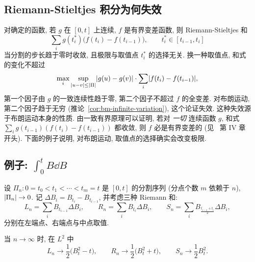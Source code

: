 \subsection{Riemann-Stieltjes 积分为何失效}

对确定的函数, 若 $g$ 在 $[0,t]$ 上连续, $f$ 是有界变差函数, 则 Riemann-Stieltjes 和
\[
\sum_ig(t_i^*)\big(f(t_i)-f(t_{i-1})\big),\qquad t_i^*\in[t_{i-1},t_i]
\]
当分割的步长趋于零时收敛, 且极限与取值点 $t_i^*$ 的选择无关. 换一种取值点, 和式的变化不超过
\[
\max_i\sup_{\lvert u-v\rvert\le\lvert\Pi\rvert}\lvert g(u)-g(v)\rvert\cdot\sum_i\lvert f(t_i)-f(t_{i-1})\rvert,
\]
第一个因子由 $g$ 的一致连续性趋于零, 第二个因子不超过 $f$ 的全变差. 对布朗运动, 第二个因子趋于无穷 (推论~\ref{cor:bm-infinite-variation}), 这个论证失效. 这种失效源于布朗运动本身的性质. 由一致有界原理可以证明, 若对 \emph{一切} 连续函数 $g$, 和式 $\sum_ig(t_{i-1})(f(t_i)-f(t_{i-1}))$ 都收敛, 则 $f$ 必是有界变差的 (见~\cite{revuz} 第 IV 章开头). 下面的例子说明, 对布朗运动, 取值点的选择确实会改变极限.

\subsection{\texorpdfstring{例子: $\int_0^tB\dd B$}{例子: ∫B dB}}

设 $\Pi_n: 0=t_0<t_1<\cdots<t_m=t$ 是 $[0,t]$ 的分割序列 (分点个数 $m$ 依赖于 $n$), $\lvert\Pi_n\rvert\to0$. 记 $\Delta B_i=B_{t_i}-B_{t_{i-1}}$, 并考虑三种 Riemann 和:
\[
L_n=\sum_iB_{t_{i-1}}\Delta B_i,\qquad R_n=\sum_iB_{t_i}\Delta B_i,\qquad S_n=\sum_iB_{\frac{t_{i-1}+t_i}{2}}\Delta B_i,
\]
分别在左端点、右端点与中点取值.

\begin{proposition}\label{prop:three-sums}
当 $n\to\infty$ 时, 在 $L^2$ 中
\[
L_n\to\frac{1}{2}\big(B_t^2-t\big),\qquad R_n\to\frac{1}{2}\big(B_t^2+t\big),\qquad S_n\to\frac{1}{2}B_t^2.
\]
\end{proposition}

